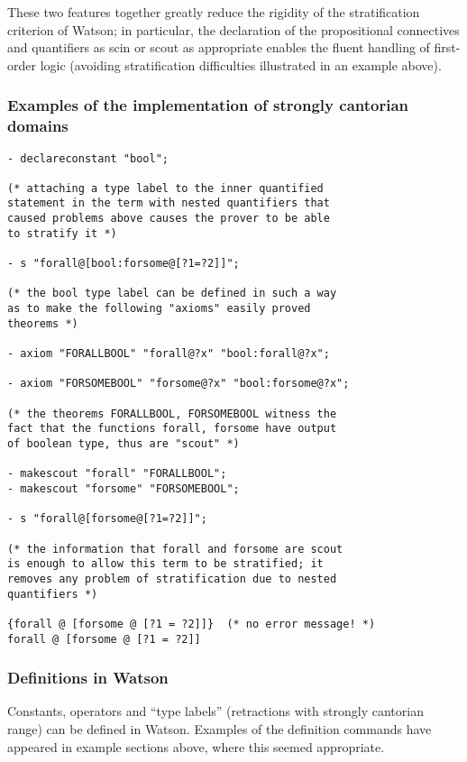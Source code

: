 \documentclass{kluwer}
\begin{document}
\begin{article}
These two features together greatly reduce the rigidity of the
stratification criterion of Watson; in particular, the declaration of
the propositional connectives and quantifiers as scin or scout as
appropriate enables the fluent handling of first-order logic (avoiding
stratification difficulties illustrated in an example above).

\subsubsection{Examples of the implementation of strongly cantorian domains}

\begin{verbatim}
- declareconstant "bool";

(* attaching a type label to the inner quantified 
statement in the term with nested quantifiers that 
caused problems above causes the prover to be able 
to stratify it *)

- s "forall@[bool:forsome@[?1=?2]]";

(* the bool type label can be defined in such a way 
as to make the following "axioms" easily proved 
theorems *)

- axiom "FORALLBOOL" "forall@?x" "bool:forall@?x";

- axiom "FORSOMEBOOL" "forsome@?x" "bool:forsome@?x";

(* the theorems FORALLBOOL, FORSOMEBOOL witness the 
fact that the functions forall, forsome have output 
of boolean type, thus are "scout" *)

- makescout "forall" "FORALLBOOL";
- makescout "forsome" "FORSOMEBOOL";

- s "forall@[forsome@[?1=?2]]";

(* the information that forall and forsome are scout 
is enough to allow this term to be stratified; it 
removes any problem of stratification due to nested 
quantifiers *)

{forall @ [forsome @ [?1 = ?2]]}  (* no error message! *)
forall @ [forsome @ [?1 = ?2]]
\end{verbatim}

\subsubsection{Definitions in Watson}

Constants, operators and ``type labels'' (retractions with strongly
cantorian range) can be defined in Watson.  Examples of the definition
commands have appeared in example sections above, where this seemed
appropriate.


\end{article}
\end{document}
